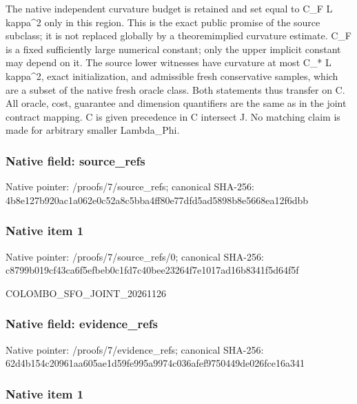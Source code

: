 \documentclass[10pt,a4paper]{article}
\begin{document}
The native independent curvature budget is retained and set equal to C\_F L kappa\textasciicircum{}2 only in this region. This is the exact public promise of the source subclass; it is not replaced globally by a theoremimplied curvature estimate. C\_F is a fixed sufficiently large numerical constant; only the upper implicit constant may depend on it. The source lower witnesses have curvature at most C\_* L kappa\textasciicircum{}2, exact initialization, and admissible fresh conservative samples, which are a subset of the native fresh oracle class. Both statements thus transfer on C. All oracle, cost, guarantee and dimension quantifiers are the same as in the joint contract mapping. C is given precedence in C intersect J. No matching claim is made for arbitrary smaller Lambda\_Phi.


\subsubsection{Native field: source\_refs}


Native pointer: /proofs/7/source\_refs; canonical SHA-256: 4b8e127b920ac1a062e0c52a\allowbreak{}8c5bba4ff80e77dfd5ad5898\allowbreak{}b8e5668ea12f6dbb



\subsubsection{Native item 1}


Native pointer: /proofs/7/source\_refs/0; canonical SHA-256: c8799b019cf43ca6f5efbeb0\allowbreak{}c1fd7c40bee23264f7e1017a\allowbreak{}d16b8341f5d64f5f


COLOMBO\_SFO\_JOINT\_20261126


\subsubsection{Native field: evidence\_refs}


Native pointer: /proofs/7/evidence\_refs; canonical SHA-256: 62d4b154c20961aa605ae1d5\allowbreak{}9fe995a9974c036afef97504\allowbreak{}49de026fce16a341



\subsubsection{Native item 1}
\end{document}
